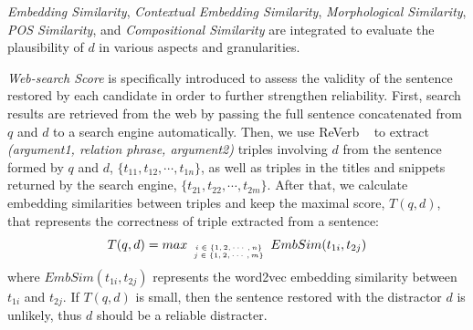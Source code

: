 \textit{Embedding Similarity}, \textit{Contextual Embedding Similarity}, \textit{Morphological Similarity}, \textit{POS Similarity}, and \textit{Compositional Similarity} are integrated to evaluate the plausibility of $d$ in various aspects and granularities. 

\textit{Web-search Score} is specifically introduced to assess
the validity of the sentence restored by each candidate in order to further strengthen reliability.  
First, search results are retrieved from the web by passing the full sentence 
concatenated from $q$ and $d$ to a search engine automatically. 
Then, we use ReVerb ~\cite{fader2011identifying} to 
extract \textit{(argument1, relation phrase, argument2)} triples 
involving $d$ from the sentence formed by $q$ and 
$d$, $\{t_{11}, t_{12}, \cdots, t_{1n}\}$, 
as well as triples in the titles and snippets returned by the search engine, 
$\{t_{21}, t_{22}, \cdots, t_{2m}\}$. 
After that, we calculate embedding similarities 
between triples and keep the maximal score, 
$T(q,d)$, that represents the correctness of triple extracted from a sentence:
\begin{equation*}
	T(q,d) = max_{\tiny \begin{array}{c}
	i\in \{1,2,\cdots,n\} \\ j \in \{1,2,\cdots,m\}
	\end{array}
	} EmbSim(t_{1i}, t_{2j})
\end{equation*}
where $EmbSim(t_{1i}, t_{2j})$ represents the word2vec embedding similarity between $t_{1i}$ and $t_{2j}$.
If $T(q,d)$ is small, then the sentence restored with the distractor $d$ is unlikely, thus $d$ should be a reliable distracter. 

